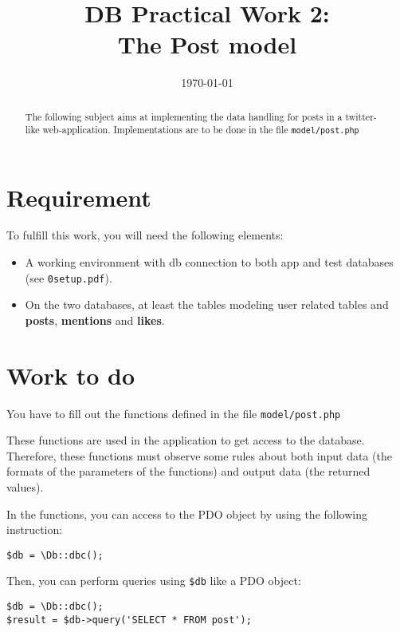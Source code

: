 \documentclass[twoside,a4paper,12pt]{article}
\title{DB Practical Work 2:\\The Post model}
\date{\today}
\begin{document}
\maketitle

\begin{abstract}
  The following subject aims at implementing the data handling for posts in a twitter-like web-application. Implementations are to be done in the file \texttt{model/post.php}
\end{abstract}

\tableofcontents

\clearpage

\section{Requirement}
To fulfill this work, you will need the following elements:

\begin{itemize}
\item A working environment with db connection to both app and test databases (see \texttt{0setup.pdf}).
\item On the two databases, at least the tables modeling user related tables and \textbf{posts}, \textbf{mentions} and \textbf{likes}.
\end{itemize}

\section{Work to do}
You have to fill out the functions defined in the file \texttt{model/post.php}

These functions are used in the application to get access to the database. Therefore, these functions must observe some rules about both input data (the formats of the parameters of the functions) and output data (the returned values).

In the functions, you can access to the PDO object by using the following instruction:

\begin{lstlisting}
$db = \Db::dbc();
\end{lstlisting}

Then, you can perform queries using \texttt{\$db} like a PDO object:
\begin{lstlisting}
$db = \Db::dbc();
$result = $db->query('SELECT * FROM post');
\end{lstlisting}
\end{document}
